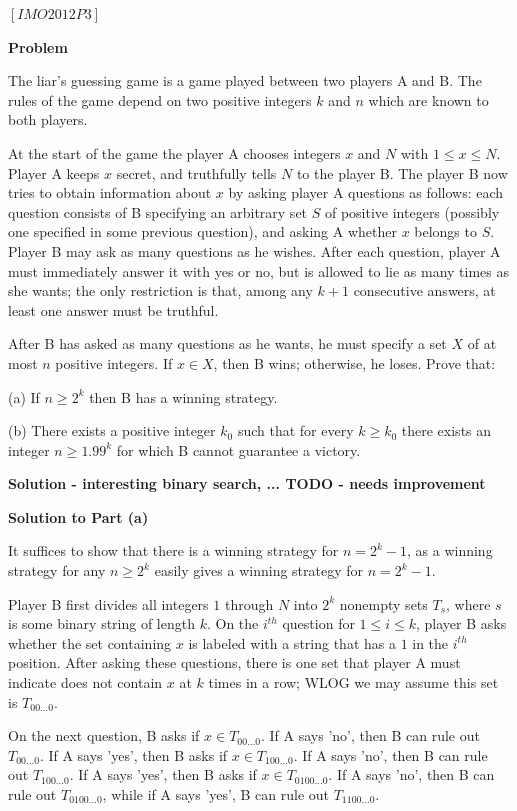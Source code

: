 \begin{problem}
$[IMO2012P3]$

\textbf{Problem}

The liar’s guessing game is a game played between two players A and B. The rules of the game depend on two positive integers $k$ and $n$ which are known to both players.

At the start of the game the player A chooses integers $x$ and $N$ with $1 \le x \le N$. Player A keeps $x$ secret, and truthfully tells $N$ to the player B. The player B now tries to obtain information about $x$ by asking player A questions as follows: each question consists of B specifying an arbitrary set $S$ of positive integers (possibly one specified in some previous question), and asking A whether $x$ belongs to $S$. Player B may ask as many questions as he wishes. After each question, player A must immediately answer it with yes or no, but is allowed to lie as many times as she wants; the only restriction is that, among any $k+1$ consecutive answers, at least one answer must be truthful.

After B has asked as many questions as he wants, he must specify a set $X$ of at most $n$ positive integers. If $x \in X$, then B wins; otherwise, he loses. Prove that:

(a) If $n \ge 2^k$ then B has a winning strategy.

(b) There exists a positive integer $k_0$ such that for every $k \ge k_0$ there exists an integer $n \ge 1.99^k$ for which B cannot guarantee a victory.



\textbf{Solution - interesting binary search, ... TODO - needs improvement}

\textbf{Solution to Part (a)}

It suffices to show that there is a winning strategy for $n = 2^k-1$, as a winning strategy for any $n \ge 2^k$ easily gives a winning strategy for $n = 2^k-1$.

Player B first divides all integers $1$ through $N$ into $2^k$ nonempty sets $T_s$, where $s$ is some binary string of length $k$. On the $i^{th}$ question for $1 \le i \le k$, player B asks whether the set containing $x$ is labeled with a string that has a $1$ in the $i^{th}$ position. After asking these questions, there is one set that player A must indicate does not contain $x$ at $k$ times in a row; WLOG we may assume this set is $T_{00 \dots 0}$.

On the next question, B asks if $x \in T_{00 \dots 0}$. If A says 'no', then B can rule out $T_{00 \dots 0}$. If A says 'yes', then B asks if $x \in T_{100 \dots 0}$. If A says 'no', then B can rule out $T_{100 \dots 0}$. If A says 'yes', then B asks if $x \in T_{0100 \dots 0}$. If A says 'no', then B can rule out $T_{0100 \dots 0}$, while if A says 'yes', B can rule out $T_{1100 \dots 0}$.


\end{problem}
